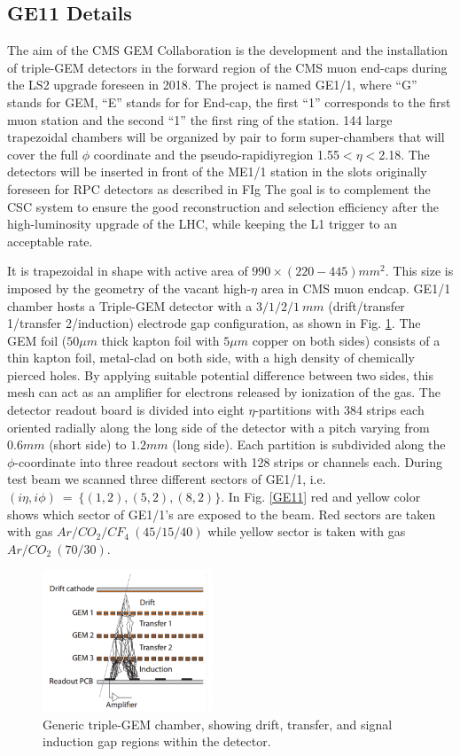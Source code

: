 \subsection{GE11 Details}
The aim of the CMS GEM Collaboration is the development and the installation of triple-GEM detectors in the forward region of the CMS muon end-caps during the LS2 upgrade foreseen in 2018. The project is named GE1/1, where ``G'' stands for GEM, ``E'' stands for for End-cap, the first ``1'' corresponds to the first muon station and the second ``1'' the first ring of the station. 144 large trapezoidal chambers will be organized by pair to form super-chambers that will cover the full $\phi$ coordinate and the pseudo-rapidiyregion 1.55$ < \eta < $2.18. The detectors will be inserted in front of the ME1/1 station in the slots originally foreseen for RPC detectors as described in FIg%
The goal is to complement the CSC system to ensure the good reconstruction and selection efficiency after the high-luminosity upgrade of the LHC, while keeping the L1 trigger to an acceptable rate. 

 It is trapezoidal in shape with active area of $990\times (220-445)mm^2$. This size is imposed by the geometry of the vacant high-$\eta$ area in CMS muon endcap. GE1/1 chamber hosts a Triple-GEM detector with a $3/1/2/1~mm$ (drift/transfer 1/transfer 2/induction) electrode gap configuration, as shown in Fig. \ref{GEM:cascade}. The GEM foil ($50\mu m$ thick kapton foil with $5\mu m$ copper on both sides) consists of a thin kapton foil, metal-clad on both side, with a high density of chemically pierced holes. By applying suitable potential difference between two sides, this mesh can act as an amplifier for electrons released by ionization of the gas. The detector readout board is divided into eight $\eta$-partitions with 384 strips each oriented radially along the long side of the detector with a pitch varying from $0.6mm$ (short side) to $1.2mm$ (long side). Each partition is subdivided along the $\phi$-coordinate into three readout sectors with 128 strips or channels each. During test beam we scanned three different sectors of GE1/1, i.e. $(i\eta,i\phi)~=~\{(1,2),(5,2),(8,2)\}$. In Fig. \ref{GE11} red and yellow color shows which sector of GE1/1's are exposed to the beam. Red sectors are taken with gas $Ar/CO_2/CF_4~(45/15/40) $ while yellow sector is taken with gas $Ar/CO_2~(70/30)$.

\begin{figure}[!htbp]
\centering
\includegraphics[width=2.0in]{figures/GEM/GEMCascade.png}
\caption{Generic triple-GEM chamber, showing drift, transfer, and signal induction gap regions within the detector.}
\label{GEM:cascade}
\end{figure}

